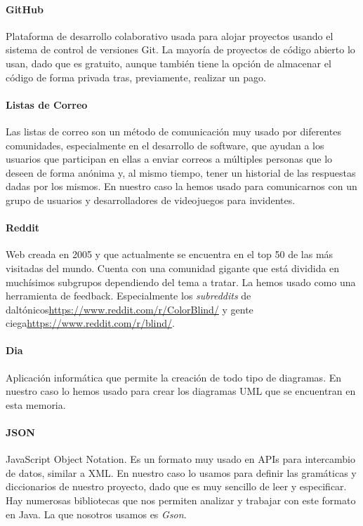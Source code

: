 \paragraph{GitHub} Plataforma de desarrollo colaborativo usada para alojar proyectos usando el sistema de control de versiones Git. La mayoría de proyectos de código abierto lo usan, dado que es gratuito, aunque también tiene la opción de almacenar el código de forma privada tras, previamente, realizar un pago.

 \paragraph{Listas de Correo} Las listas de correo son un método de comunicación muy usado por diferentes comunidades, especialmente en el desarrollo de software, que ayudan a los usuarios que participan en ellas a enviar correos a múltiples personas que lo deseen de forma anónima y, al mismo tiempo, tener un historial de las respuestas dadas por los mismos. En nuestro caso la hemos usado para comunicarnos con un grupo de usuarios y desarrolladores de videojuegos para invidentes.

 \paragraph{Reddit} Web creada en 2005 y que actualmente se encuentra en el top 50 de las más visitadas del mundo. Cuenta con una comunidad gigante que está dividida en muchísimos subgrupos dependiendo del tema a tratar. La hemos usado como una herramienta de feedback. Especialmente los \textit{subreddits} de daltónicos\url{https://www.reddit.com/r/ColorBlind/} y gente ciega\url{https://www.reddit.com/r/blind/}. 

\paragraph{Dia} Aplicación informática que permite la creación de todo tipo de diagramas. En nuestro caso lo hemos usado para crear los diagramas UML que se encuentran en esta memoria.

\paragraph{JSON} JavaScript Object Notation. Es un formato muy usado en APIs para intercambio de datos, similar a XML. En nuestro caso lo usamos para definir las gramáticas y diccionarios de nuestro proyecto, dado que es muy sencillo de leer y especificar. Hay numerosas bibliotecas que nos permiten analizar y trabajar con este formato en Java. La que nosotros usamos es \textit{Gson}.

